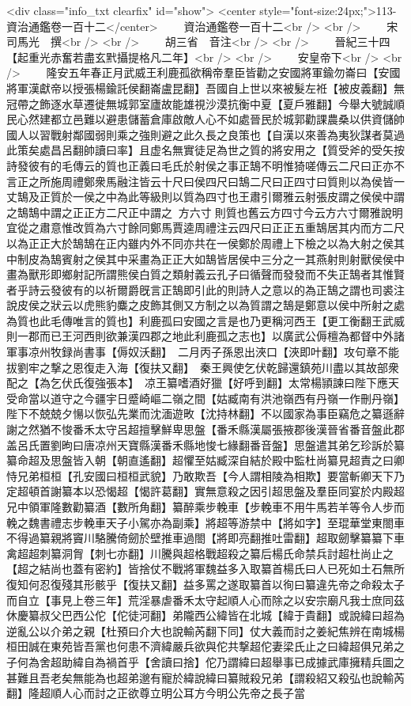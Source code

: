 <div class="info_txt clearfix" id="show">
<center style="font-size:24px;">113-資治通鑑卷一百十二</center>
  　　資治通鑑卷一百十二<br />
<br />
　　宋　司馬光　撰<br />
<br />
　　胡三省　音注<br />
<br />
　　晉紀三十四【起重光赤奮若盡玄黓攝提格凡二年】<br />
<br />
　　安皇帝下<br />
<br />
　　隆安五年春正月武威王利鹿孤欲稱帝羣臣皆勸之安國將軍鍮勿崙曰【安國將軍漢獻帝以授張楊鍮託侯翻崙盧昆翻】吾國自上世以來被髮左袵【被皮義翻】無冠帶之飾逐水草遷徙無城郭室廬故能雄視沙漠抗衡中夏【夏戶雅翻】今舉大號誠順民心然建都立邑難以避患儲蓄倉庫啟敵人心不如處晉民於城郭勸課農桑以供資儲帥國人以習戰射鄰國弱則乘之強則避之此久長之良策也【自漢以來善為夷狄謀者莫過此策矣處昌呂翻帥讀曰率】且虚名無實徒足為世之質的將安用之【質受斧的受矢按詩發彼有的毛傳云的質也正義曰毛氏於射侯之事正鵠不明惟猗嗟傳云二尺曰正亦不言正之所施周禮鄭衆馬融注皆云十尺曰侯四尺曰鵠二尺曰正四寸曰質則以為侯皆一丈鵠及正質於一侯之中為此等級則以質為四寸也王肅引爾雅云射張皮謂之侯侯中謂之鵠鵠中謂之正正方二尺正中謂之方六寸則質也舊云方四寸今云方六寸爾雅說明宜從之肅意惟改質為六寸餘同鄭馬賈逵周禮注云四尺曰正正五重鵠居其内而方二尺以為正正大於鵠鵠在正内雖内外不同亦共在一侯鄭於周禮上下檢之以為大射之侯其中制皮為鵠賓射之侯其中采畫為正正大如鵠皆居侯中三分之一其燕射則射獸侯侯中畫為獸形即鄉射記所謂熊侯白質之類射義云孔子曰循聲而發發而不失正鵠者其惟賢者乎詩云發彼有的以祈爾爵旣言正鵠即引此的則詩人之意以的為正鵠之謂也司裘注說皮侯之狀云以虎熊豹麋之皮飾其側又方制之以為質謂之鵠是鄭意以侯中所射之處為質也此毛傳唯言的質也】利鹿孤曰安國之言是也乃更稱河西王【更工衡翻王武威則一郡而已王河西則欲兼漢四郡之地此利鹿孤之志也】以廣武公傉檀為都督中外諸軍事凉州牧録尚書事【傉奴沃翻】　二月丙子孫恩出浹口【浹即叶翻】攻句章不能拔劉牢之撃之恩復走入海【復扶又翻】　秦王興使乞伏乾歸還鎮苑川盡以其故部衆配之【為乞伏氏復強張本】　凉王纂嗜酒好獵【好呼到翻】太常楊頴諫曰陛下應天受命當以道守之今疆宇日蹙崎嶇二嶺之間【姑臧南有洪池嶺西有丹嶺一作刪丹嶺】陛下不兢兢夕愓以恢弘先業而沈湎遊畋【沈持林翻】不以國家為事臣竊危之纂遜辭謝之然猶不悛番禾太守呂超擅擊鮮卑思盤【番禾縣漢屬張掖郡後漢晉省番音盤此郡盖呂氏置劉昫曰唐凉州天寶縣漢番禾縣地悛七緣翻番音盤】思盤遣其弟乞珍訴於纂纂命超及思盤皆入朝【朝直遙翻】超懼至姑臧深自結於殿中監杜尚纂見超責之曰卿恃兄弟桓桓【孔安國曰桓桓武貌】乃敢欺吾【今人謂相陵為相欺】要當斬卿天下乃定超頓首謝纂本以恐愒超【愒許葛翻】實無意殺之因引超思盤及羣臣同宴於内殿超兄中領軍隆數勸纂酒【數所角翻】纂醉乘步輓車【步輓車不用牛馬若羊等令人步而輓之魏書禮志步輓車天子小駕亦為副乘】將超等游禁中【將如字】至琨華堂東閤車不得過纂親將竇川駱騰倚劒於壁推車過閤【將即亮翻推吐雷翻】超取劒擊纂纂下車禽超超刺纂洞胷【刺七亦翻】川騰與超格戰超殺之纂后楊氏命禁兵討超杜尚止之【超之結尚也蓋有密約】皆捨仗不戰將軍魏益多入取纂首楊氏曰人已死如土石無所復知何忍復殘其形骸乎【復扶又翻】益多罵之遂取纂首以徇曰纂違先帝之命殺太子而自立【事見上卷三年】荒淫暴虐番禾太守起順人心而除之以安宗廟凡我士庶同茲休慶纂叔父巴西公佗【佗徒河翻】弟隴西公緯皆在北城【緯于貴翻】或說緯曰超為逆亂公以介弟之親【杜預曰介大也說輸芮翻下同】仗大義而討之姜紀焦辨在南城楊桓田誠在東苑皆吾黨也何患不濟緯嚴兵欲與佗共撃超佗妻梁氏止之曰緯超俱兄弟之子何為舍超助緯自為禍首乎【舍讀曰捨】佗乃謂緯曰超舉事已成據武庫擁精兵圖之甚難且吾老矣無能為也超弟邈有寵於緯說緯曰纂賊殺兄弟【謂殺紹又殺弘也說輸芮翻】隆超順人心而討之正欲尊立明公耳方今明公先帝之長子當